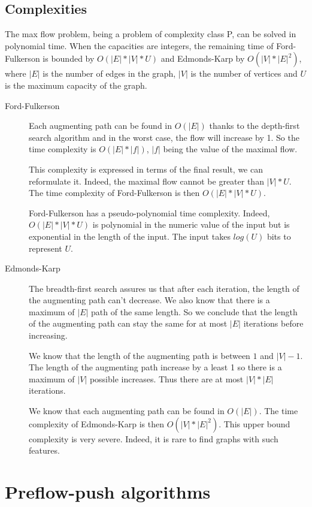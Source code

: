 \subsection{Complexities}
The max flow problem, being a problem of complexity class P, can be solved in polynomial time. When the capacities are integers, the remaining time of Ford-Fulkerson is bounded by $O(|E|*|V|*U)$ and Edmonds-Karp by $O(|V|*|E|^2)$, where $|E|$ is the number of edges in the graph, $|V|$ is the number of vertices and $U$ is the maximum capacity of the graph.

\begin{description}
\item[Ford-Fulkerson]{Each augmenting path can be found in $O(|E|)$ thanks to the depth-first search algorithm and in the worst case, the flow will increase by 1. So the time complexity is $O(|E|*|f|)$, $|f|$ being the value of the maximal flow. 

This complexity is expressed in terms of the final result, we can reformulate it. Indeed, the maximal flow cannot be greater than $|V|*U$. The time complexity of Ford-Fulkerson is then $O(|E|*|V|*U)$.

Ford-Fulkerson has a pseudo-polynomial time complexity. Indeed, $O(|E|*|V|*U)$ is polynomial in the numeric value of the input but is exponential in the length of the input. The input takes $log(U)$ bits to represent $U$.}

\item[Edmonds-Karp]{The breadth-first search assures us that after each iteration, the length of the augmenting path can't decrease. We also know that there is a maximum of $|E|$ path of the same length. So we conclude that the length of the augmenting path can stay the same for at most $|E|$ iterations before increasing. 

We know that the length of the augmenting path is between $1$ and $|V|-1$. The length of the augmenting path increase by a least 1 so there is a maximum of $|V|$ possible increases. Thus there are at most $|V|*|E|$ iterations.

We know that each augmenting path can be found in $O(|E|)$. The time complexity of Edmonds-Karp is then $O(|V|*|E|^2)$. This upper bound complexity is very severe. Indeed, it is rare to find graphs with such features.}
\end{description}



\section{Preflow-push algorithms}
\label{sec:preflow}

